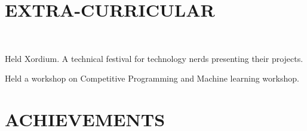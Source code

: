 \documentclass[a4paper]{deedy-resume-openfont}
\begin{document}
\begin{minipage}[t]{0.66\textwidth}
\section{EXTRA-CURRICULAR}

 \\
\vspace{\topsep} %
\begin{tightemize}
\item Held Xordium. A technical festival for technology nerds presenting their projects.
\item Held a workshop on Competitive Programming and Machine learning workshop.
\end{tightemize}
\sectionsep
\section{ACHIEVEMENTS} 

\textbullet{} 
\sectionsep

\end{minipage} 
\end{document}
